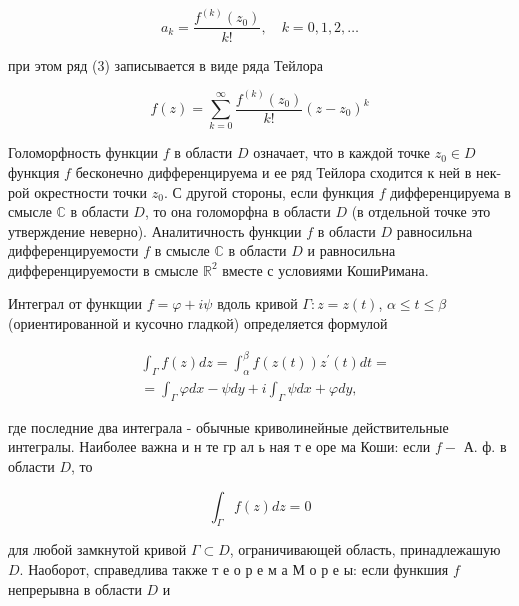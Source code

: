 \documentclass[10pt]{article}
\begin{document}
\[

a_{k}=\frac{f^{(k)}\left(z_{0}\right)}{k !}, \quad k=0,1,2, \ldots

\]



при этом ряд (3) записывается в виде ряда Тейлора



\[

f(z)=\sum_{k=0}^{\infty} \frac{f^{(k)}\left(z_{0}\right)}{k !}\left(z-z_{0}\right)^{k}

\]



Голоморфность функции $f$ в области $D$ означает, что в каждой точке $z_{0} \in D$ функция $f$ бесконечно дифференцируема и ее ряд Тейлора сходится к ней в нек-рой окрестности точки $z_{0}$. С другой стороны, если функция $f$ дифференцируема в смысле $\mathbb{C}$ в области $D$, то она голоморфна в области $D$ (в отдельной точке это утверждение неверно). Аналитичность функции $f$ в области $D$ равносильна дифференцируемости $f$ в смысле $\mathbb{C}$ в области $D$ и равносильна дифференцируемости в смысле $\mathbb{R}^{2}$ вместе с условиями КошиРимана.



Интеграл от функщии $f=\varphi+i \psi$ вдоль кривой $\Gamma: z=z(t)$, $\alpha \leqslant t \leqslant \beta$ (ориентированной и кусочно гладкой) определяется формулой



\[

\begin{aligned}

& \int_{\Gamma} f(z) d z=\int_{\alpha}^{\beta} f(z(t)) z^{\prime}(t) d t= \\

& =\int_{\Gamma} \varphi d x-\psi d y+i \int_{\Gamma} \psi d x+\varphi d y,

\end{aligned}

\]



где последние два интеграла - обычные криволинейные действительные интегралы. Наиболее важна и н те гр ал ь ная т е оре ма Коши: если $f-$ А. ф. в области $D$, то



\[

\int_{\Gamma} f(z) d z=0

\]



для любой замкнутой кривой $\Gamma \subset D$, ограничивающей область, принадлежашую $D$. Наоборот, справедлива также т е о р е м а М о р е ы: если функшия $f$ непрерывна в области $D$ и
\end{document}

